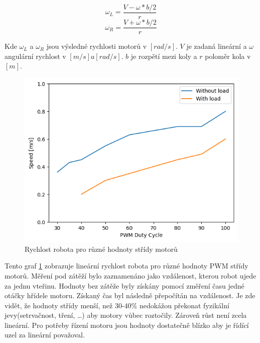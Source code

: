 \begin{equation}
	\omega_L = \frac{V - \omega * b/2}{r}
\end{equation}
\begin{equation}
	\omega_R = \frac{V + \omega * b/2}{r}
\end{equation}

\noindent Kde $\omega_L$ a $\omega_R$ jsou výsledné rychlosti motorů v $[rad/s]$. $V$ je zadaná lineární a $\omega$ angulární rychlost v $[m/s] a [rad/s]$. $b$ je rozpětí mezi koly a $r$ poloměr kola v $[m]$. \cite{diff_drive}

\begin{figure}[h!]
	\centering
	\includegraphics[scale=0.75]{obrazky-figures/motors_graph.png}
	\caption{Rychlost robota pro různé hodnoty střídy motorů}
	\label{fig:motor_pwm_graph}
\end{figure}
Tento graf \ref{fig:motor_pwm_graph} zobrazuje lineární rychlost robota pro různé hodnoty PWM střídy motorů. Měření pod zátěží bylo zaznamenáno jako vzdálenost, kterou robot ujede za jednu vteřinu. Hodnoty bez zátěže byly získány pomocí změření času jedné otáčky hřídele motoru. Získaný čas byl následně přepočítán na vzdálenost. Je zde vidět, že hodnoty střídy menší, než 30-40\% nedokážou překonat fyzikální jevy(setrvačnost, tření, \dots) aby motory vůbec roztočily. Zároveň růst není zcela lineární. Pro potřeby řízení motoru jsou hodnoty dostatečně blízko aby je řídící uzel za lineární považoval.

